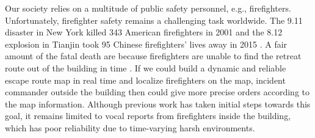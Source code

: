 \documentclass[conference]{IEEEtran}
\begin{document}
%





Our society relies on a multitude of public safety personnel, e.g., firefighters. Unfortunately, firefighter safety remains a challenging task worldwide. The 9.11 disaster in New York killed 343 American firefighters in 2001 \cite{911} and the 8.12 explosion in Tianjin took 95 Chinese firefighters' lives away in 2015 \cite{TianJinGang}. A fair amount of the fatal death are because firefighters are unable to find the retreat route out of the building in time \cite{fahy2002us}. If we could build a dynamic and reliable escape route map in real time and localize firefighters on the map, incident commander outside the building then could give more precise orders according to the map information. Although previous work has taken initial steps towards this goal, it remains limited to vocal reports from firefighters inside the building, which has poor reliability due to time-varying harsh environments.
\end{document}

